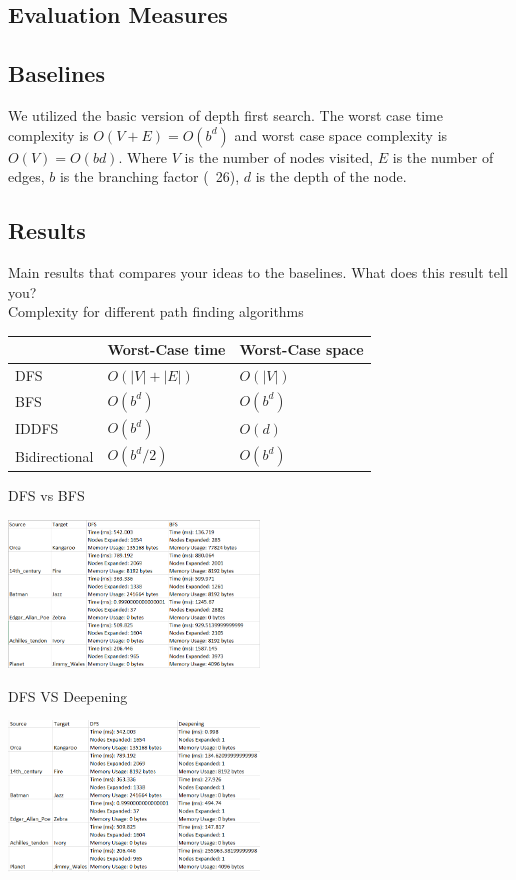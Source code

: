\documentclass[letterpaper]{article} %
\begin{document}
\subsection{Evaluation Measures}

\subsection{Baselines}

We utilized the basic version of depth first search. The worst case time complexity is $O(V + E) = O (b^d)$ and worst case space complexity is $O(V) = O(bd)$. Where $V$ is the number of nodes visited, $E$ is the number of edges, $b$ is the branching factor (~26), $d$ is the depth of the node.

\subsection{Results}

Main results that compares your ideas to the baselines.
What does this result tell you?\\

Complexity for different path finding algorithms\\

    \begin{tabular}{l|l|l}
        & Worst-Case time & Worst-Case space\\
        \hline
        DFS &$O(|V| + |E|)$ & $O(|V|)$\\
        BFS &$O(b^d)$ & $O(b^d)$\\
        IDDFS&$O(b^d)$& $O(d)$\\
        Bidirectional &$O(b^d/2)$ & $O(b^d)$\\
    \end{tabular}
    
DFS vs BFS

\includegraphics[width=0.5\textwidth]{Images/BFS.png}

DFS VS Deepening

\includegraphics[width=0.5\textwidth]{Images/Deepening.png}
\end{document}
